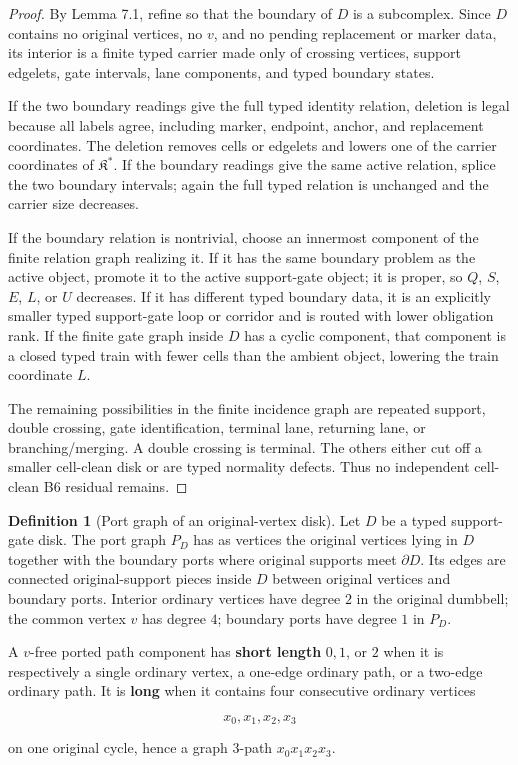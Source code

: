 \documentclass[11pt]{amsart}
\theoremstyle{definition}
\newtheorem{definition}[theorem]{Definition}
\begin{document}
\begin{proof}
By Lemma 7.1, refine so that the boundary of \(D\) is a subcomplex. Since \(D\) contains no original vertices, no \(v\), and no pending replacement or marker data, its interior is a finite typed carrier made only of crossing vertices, support edgelets, gate intervals, lane components, and typed boundary states.

If the two boundary readings give the full typed identity relation, deletion is legal because all labels agree, including marker, endpoint, anchor, and replacement coordinates. The deletion removes cells or edgelets and lowers one of the carrier coordinates of \(\mathfrak K^\ast\). If the boundary readings give the same active relation, splice the two boundary intervals; again the full typed relation is unchanged and the carrier size decreases.

If the boundary relation is nontrivial, choose an innermost component of the finite relation graph realizing it. If it has the same boundary problem as the active object, promote it to the active support-gate object; it is proper, so \(Q\), \(S\), \(E\), \(L\), or \(U\) decreases. If it has different typed boundary data, it is an explicitly smaller typed support-gate loop or corridor and is routed with lower obligation rank. If the finite gate graph inside \(D\) has a cyclic component, that component is a closed typed train with fewer cells than the ambient object, lowering the train coordinate \(L\).

The remaining possibilities in the finite incidence graph are repeated support, double crossing, gate identification, terminal lane, returning lane, or branching/merging. A double crossing is terminal. The others either cut off a smaller cell-clean disk or are typed normality defects. Thus no independent cell-clean B6 residual remains.

\end{proof}
\begin{definition}[Port graph of an original-vertex disk]
Let \(D\) be a typed support-gate disk. The port graph \(P_D\) has as vertices the original vertices lying in \(D\) together with the boundary ports where original supports meet \(\partial D\). Its edges are connected original-support pieces inside \(D\) between original vertices and boundary ports. Interior ordinary vertices have degree \(2\) in the original dumbbell; the common vertex \(v\) has degree \(4\); boundary ports have degree \(1\) in \(P_D\).

A \(v\)-free ported path component has \textbf{short length} \(0,1\), or \(2\) when it is respectively a single ordinary vertex, a one-edge ordinary path, or a two-edge ordinary path. It is \textbf{long} when it contains four consecutive ordinary vertices

\[
x_0,x_1,x_2,x_3
\]

on one original cycle, hence a graph \(3\)-path \(x_0x_1x_2x_3\).

\end{definition}
\end{document}
